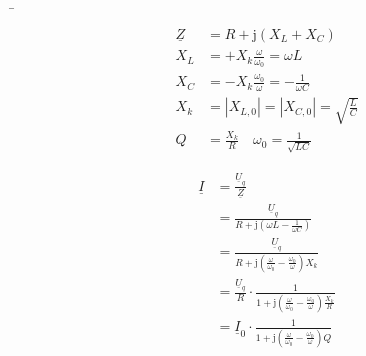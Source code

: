 \b{%
\begin{frame}%
\begin{minipage}{0.3\textwidth}%
    \begin{align}
        \underline{Z} &= R + \mathrm{j}(X_L + X_C) \\
        X_L &= +X_k \frac{\omega}{\omega_0} = \omega L \\
        X_C &= -X_k \frac{\omega_0}{\omega} = -\frac{1}{\omega C}\\
        X_k &= |X_{L,0}| = |X_{C,0}| = \sqrt{\frac{L}{C}}\\
        Q &= \frac{X_k}{R} \quad \omega_0 = \frac{1}{\sqrt{LC}}
    \end{align}
\end{minipage}\hfill%
\begin{minipage}{0.65\textwidth}\centering
    \begin{equation}
        \begin{aligned}
    \underline{I} &= \frac{\underline{U}_q}{\underline{Z}} \\
    &= \frac{\underline{U}_q}{R + \mathrm{j}\left(\omega L - \frac{1}{\omega C}\right)} \\
    &= \frac{\underline{U}_q}{R + \mathrm{j}\left(\frac{\omega}{\omega_0} - \frac{\omega_0}{\omega}\right)X_k} \\
    &= \frac{\underline{U}_q}{R} \cdot \frac{1}{1 + \mathrm{j}\left(\frac{\omega}{\omega_0} - \frac{\omega_0}{\omega}\right)\frac{X_k}{R}} \\
    &= \underline{I}_0 \cdot \frac{1}{1 + \mathrm{j}\left(\frac{\omega}{\omega_0} - \frac{\omega_0}{\omega}\right)Q}
        \end{aligned}
    \end{equation}
\end{minipage}
\end{frame}
}

